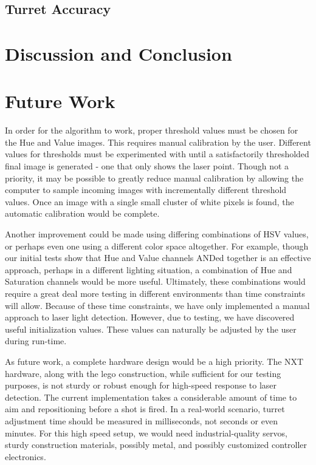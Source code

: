 \documentclass[10pt,twocolumn,letterpaper]{article}
\begin{document}
\subsection{Turret Accuracy}


\section{Discussion and Conclusion}


\section{Future Work}

In order for the algorithm to work, proper threshold values must be chosen for the Hue and Value images.  This requires manual calibration by the user.  Different values for thresholds must be experimented with until a satisfactorily thresholded final image is generated - one that only shows the laser point.  Though not a priority, it may be possible to greatly reduce manual calibration by allowing the computer to sample incoming images with incrementally different threshold values.  Once an image with a single small cluster of white pixels is found, the automatic calibration would be complete.

Another improvement could be made using differing combinations of HSV values, or perhaps even one using a different color space altogether.  For example, though our initial tests show that Hue and Value channels ANDed together is an effective approach, perhaps in a different lighting situation, a combination of Hue and Saturation channels would be more useful.  Ultimately, these combinations would require a great deal more testing in different environments than time constraints will allow.  Because of these time constraints, we have only implemented a manual approach to laser light detection.  However, due to testing, we have discovered useful initialization values.  These values can naturally be adjusted by the user during run-time.

As future work, a complete hardware design would be a high priority.  The NXT hardware, along with the lego construction, while sufficient for our testing purposes, is not sturdy or robust enough for high-speed response to laser detection.  The current implementation takes a considerable amount of time to aim and repositioning before a shot is fired.  In a real-world scenario, turret adjustment time should be measured in milliseconds, not seconds or even minutes.  For this high speed setup, we would need industrial-quality servos, sturdy construction materials, possibly metal, and possibly customized controller electronics.
\end{document}
